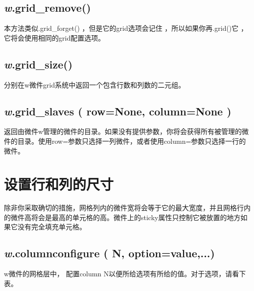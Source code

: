 \documentclass[11pt,a4paper,oneside]{book}
\begin{document}
\subsection*{\textsf{\textit{w}.grid\_remove()}}
\par{本方法类似.grid\_forget() ，但是它的grid选项会记住 ，所以如果你再.grid()它 ，它将会使用相同的grid配置选项。}

\subsection*{\textsf{\textit{w}.grid\_size()}}
\par{分别在w微件grid系统中返回一个包含行数和列数的二元组。}

\subsection*{\textsf{\textit{w}.grid\_slaves ( row=None, column=None )}}
\par{返回由微件w管理的微件的目录。如果没有提供参数，你将会获得所有被管理的微件的目录。使用row=参数只选择一列微件，或者使用column=参数只选择一行的微件。}

\section[设置行和列的尺寸]{设置行和列的尺寸}
\par{除非你采取确切的措施，网格列内的微件宽将会等于它的最大宽度，并且网格行内的微}件高将会是最高的单元格的高。微件上的sticky属性只控制它被放置的地方如果它没有完全填充单元格。

\subsection*{\textsf{\textit{w}.columnconfigure ( N, option=value,...)}}
\par{w微件的网格层中， 配置column N以便所给选项有所给的值。对于选项，请看下表。}
\end{document}
